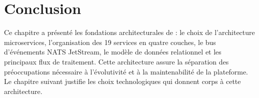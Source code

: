 \section*{Conclusion}

Ce chapitre a présenté les fondations architecturales de \caimp{} : le choix
de l'architecture microservices, l'organisation des 19 services en quatre couches,
le bus d'événements NATS JetStream, le modèle de données relationnel et les
principaux flux de traitement. Cette architecture assure la séparation des
préoccupations nécessaire à l'évolutivité et à la maintenabilité de la plateforme.
Le chapitre suivant justifie les choix technologiques qui donnent corps à cette architecture.
